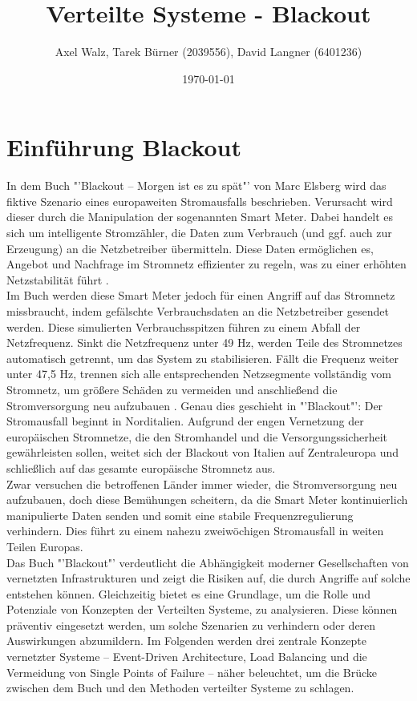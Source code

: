\documentclass[a4paper,12pt]{article}
\title{Verteilte Systeme - Blackout}
\author{Axel Walz, Tarek Bürner (2039556), David Langner (6401236)}
\date{\today}
\let\stdsection\section
\renewcommand\section{\newpage\stdsection}
\begin{document}
\onehalfspacing 

\maketitle

\newpage 
\tableofcontents
\newpage 
\pagestyle{plain}

\section{Einführung Blackout}
In dem Buch "'Blackout – Morgen ist es zu spät"' von Marc Elsberg wird das fiktive Szenario eines europaweiten Stromausfalls beschrieben. Verursacht wird dieser durch die Manipulation der sogenannten Smart Meter. Dabei handelt es sich um intelligente Stromzähler, die Daten zum Verbrauch (und ggf. auch zur Erzeugung) an die Netzbetreiber übermitteln. Diese Daten ermöglichen es, Angebot und Nachfrage im Stromnetz effizienter zu regeln, was zu einer erhöhten Netzstabilität führt \cite{SmartMeter}. \\
Im Buch werden diese Smart Meter jedoch für einen Angriff auf das Stromnetz missbraucht, indem gefälschte Verbrauchsdaten an die Netzbetreiber gesendet werden. Diese simulierten Verbrauchsspitzen führen zu einem Abfall der Netzfrequenz. Sinkt die Netzfrequenz unter 49 Hz, werden Teile des Stromnetzes automatisch getrennt, um das System zu stabilisieren. Fällt die Frequenz weiter unter 47,5 Hz, trennen sich alle entsprechenden Netzsegmente vollständig vom Stromnetz, um größere Schäden zu vermeiden und anschließend die Stromversorgung neu aufzubauen \cite{Netzfrequenz}. Genau dies geschieht in "'Blackout"': Der Stromausfall beginnt in Norditalien. Aufgrund der engen Vernetzung der europäischen Stromnetze, die den Stromhandel und die Versorgungssicherheit gewährleisten sollen, weitet sich der Blackout von Italien auf Zentraleuropa und schließlich auf das gesamte europäische Stromnetz aus.\\
Zwar versuchen die betroffenen Länder immer wieder, die Stromversorgung neu aufzubauen, doch diese Bemühungen scheitern, da die Smart Meter kontinuierlich manipulierte Daten senden und somit eine stabile Frequenzregulierung verhindern. Dies führt zu einem nahezu zweiwöchigen Stromausfall in weiten Teilen Europas.\\
Das Buch "'Blackout"' verdeutlicht die Abhängigkeit moderner Gesellschaften von vernetzten Infrastrukturen und zeigt die Risiken auf, die durch Angriffe auf solche entstehen können. Gleichzeitig bietet es eine Grundlage, um die Rolle und Potenziale von Konzepten der Verteilten Systeme, zu analysieren. Diese können präventiv eingesetzt werden, um solche Szenarien zu verhindern oder deren Auswirkungen abzumildern. Im Folgenden werden drei zentrale Konzepte vernetzter Systeme – Event-Driven Architecture, Load Balancing und die Vermeidung von Single Points of Failure – näher beleuchtet, um die Brücke zwischen dem Buch und den Methoden verteilter Systeme zu schlagen.
\end{document}
